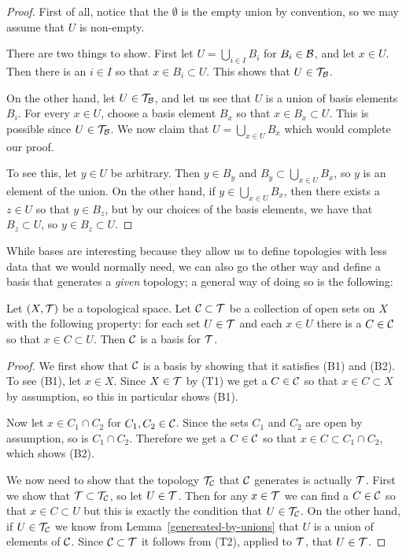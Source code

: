 \begin{proof}
  First of all, notice that the $\emptyset$ is the empty union by convention, so we may assume that $U$ is non-empty.

  There are two things to show. First let $U = \bigcup_{i \in I} B_i$ for $B_i \in \mathcal{B}$, and let $x \in U$. Then there is an $i \in I$ so that $x \in B_i \subset U$. This shows that $U \in \mathcal{T}_{\mathcal{B}}$.
  
  On the other hand, let $U \in \mathcal{T}_{\mathcal{B}}$, and let us see that $U$ is a union of basis elements $B_i$. For every $x \in U$, choose a basis element $B_x$ so that $x \in B_x \subset U$. This is possible since $U \in \mathcal{T}_{\mathcal{B}}$. We now claim that $U = \bigcup_{x \in U} B_x$ which would complete our proof.
  
  To see this, let $y \in U$ be arbitrary. Then $y \in B_y$ and $B_y \subset \bigcup_{x \in U} B_x$, so $y$ is an element of the union. On the other hand, if $y \in \bigcup_{x \in U} B_x$, then there exists a $z \in U$ so that $y \in B_z$, but by our choices of the basis elements, we have that $B_z \subset U$, so $y \in B_z \subset U$.
\end{proof}
While bases are interesting because they allow us to define topologies with less data that we would normally need, we can also go the other way and define a basis that generates a \emph{given} topology; a general way of doing so is the following:
\begin{lem}
  Let $(X,\mathcal{T})$ be a topological space. Let $\mathcal{C} \subset \mathcal{T}$ be a collection of open sets on $X$ with the following property: for each set $U \in \mathcal{T}$ and each $x \in U$ there is a $C \in \mathcal{C}$ so that $x \in C \subset U$. Then $\mathcal{C}$ is a basis for $\mathcal{T}$.
\end{lem}
\begin{proof}
  We first show that $\mathcal{C}$ is a basis by showing that it satisfies (B1) and (B2). To see (B1), let $x \in X$. Since $X \in \mathcal{T}$ by (T1) we get a $C \in \mathcal{C}$ so that $x \in C \subset X$ by assumption, so this in particular shows (B1).
  
  Now let $x \in C_1 \cap C_2$ for $C_1,C_2 \in \mathcal{C}$. Since the sets $C_1$ and $C_2$ are open by assumption, so is $C_1 \cap C_2$. Therefore we get a $C \in \mathcal{C}$ so that $x \in C \subset C_1 \cap C_2$, which shows (B2).
  
  We now need to show that the topology $\mathcal{T}_{\mathcal{C}}$ that $\mathcal{C}$ generates is actually $\mathcal{T}$. First we show that $\mathcal{T} \subset \mathcal{T}_{\mathcal{C}}$, so let $U \in \mathcal{T}$. Then for any $x \in \mathcal{T}$ we can find a $C \in \mathcal{C}$ so that $x \in C \subset U$ but this is exactly the condition that $U \in \mathcal{T}_{\mathcal{C}}$. On the other hand, if $U \in \mathcal{T}_{\mathcal{C}}$ we know from Lemma~\ref{genereated-by-unions} that $U$ is a union of elements of $\mathcal{C}$. Since $\mathcal{C} \subset \mathcal{T}$ it follows from (T2), applied to $\mathcal{T}$, that $U \in \mathcal{T}$.
\end{proof}

